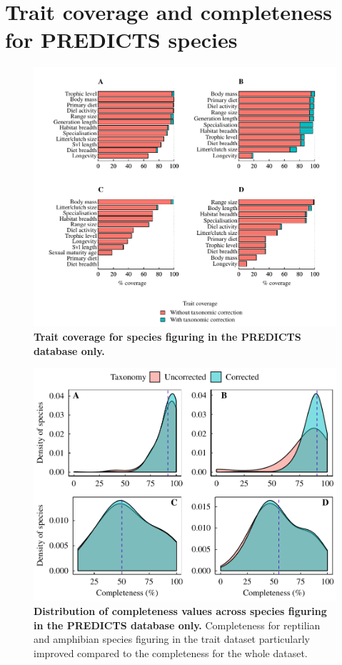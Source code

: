 \documentclass[11pt]{article}
\begin{document}
\section{Trait coverage and completeness for PREDICTS species}
\begin{figure}[h!]
\centering
\includegraphics[scale=0.7]{figures/Predicts}
\caption[Trait coverage for species figuring in the PREDICTS database only]{\textbf{Trait coverage for species figuring in the PREDICTS database only.}}
\label{covPREDICTS}
\end{figure}

\begin{figure}[h!]
\centering
\includegraphics[scale=0.7]{figures/Traitcompleteness_PREDICTS}
\caption[Distribution of completeness values across species figuring in the PREDICTS database only]{\textbf{Distribution of completeness values across species figuring in the PREDICTS database only.} Completeness for reptilian and amphibian species figuring in the trait dataset particularly improved compared to the completeness for the whole dataset.}
\label{compPREDICTS}
\end{figure}
\end{document}
